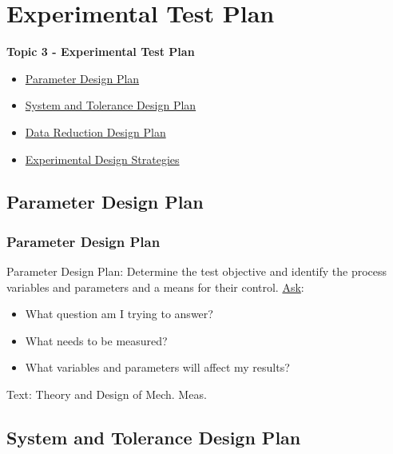\documentclass[fleqn]{beamer} %
\newcommand{\sectionIIItitle}{Experimental Test Plan}
\newcommand{\sectionIIIsubsectionItitle}{Parameter Design Plan}
\newcommand{\sectionIIIsubsectionIItitle}{System and Tolerance Design Plan}
\newcommand{\sectionIIIsubsectionIIItitle}{Data Reduction Design Plan}
\newcommand{\sectionIIIsubsectionIVtitle}{Experimental Design Strategies}
\begin{document}
	\section{\sectionIIItitle}\label{sectionIII}

		\begin{frame}
			\large \textbf{Topic 3 - \sectionIIItitle} \vspace{3mm}\\

			\begin{itemize}
				\item \hyperlink{sectionIIIsubsectionI}{\sectionIIIsubsectionItitle} \vspc %
				\item \hyperlink{sectionIIIsubsectionII}{\sectionIIIsubsectionIItitle} \vspc %
				\item \hyperlink{sectionIIIsubsectionIII}{\sectionIIIsubsectionIIItitle} \vspc %
				\item \hyperlink{sectionIIIsubsectionIV}{\sectionIIIsubsectionIVtitle} \vspc %
			\end{itemize}
		\end{frame}

		\subsection{\sectionIIIsubsectionItitle}\label{sectionIIIsubsectionI}

			\begin{frame}
				\frametitle{\sectionIIIsubsectionItitle}

				{\BL Parameter Design Plan}: Determine the test objective and identify the process variables and
				parameters and a means for their control. \vspc
				\underline{Ask}: \begin{itemize}
				\item What question am I trying to answer?
				\item What needs to be measured?
				\item What variables and parameters will affect my results?
				\end{itemize} 

				{\tiny Text: Theory and Design of Mech. Meas.}
			\end{frame}

		\subsection{\sectionIIIsubsectionIItitle}\label{sectionIIIsubsectionII}	
\end{document}
